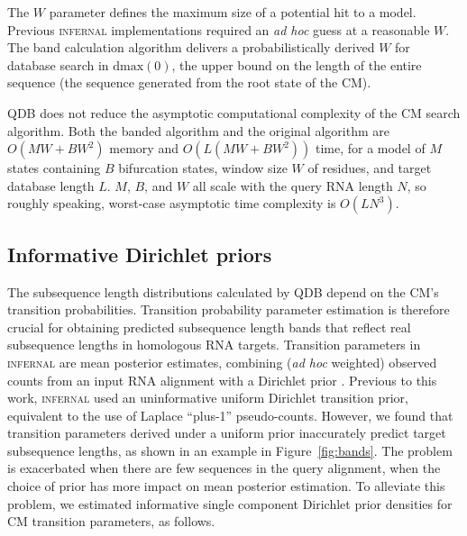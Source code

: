 \documentclass[11pt]{article}
\newif\ifdraft
\begin{document}
The $W$ parameter defines the maximum size of a potential hit to a
model. Previous \textsc{infernal} implementations required an \emph{ad
hoc} guess at a reasonable $W$. The band calculation algorithm
delivers a probabilistically derived $W$ for database search in
$\mbox{dmax}(0)$, the upper bound on the length of the entire
sequence (the sequence generated from the root state of the CM).

QDB does not reduce the asymptotic computational complexity of the CM
search algorithm.  Both the banded algorithm and the original
algorithm are $O(MW + BW^2)$ memory and $O(L(MW + BW^2))$ time, for a
model of $M$ states containing $B$ bifurcation states, window size $W$
of residues, and target database length $L$.  $M$, $B$, and $W$ all
scale with the query RNA length $N$, so roughly speaking,
worst-case asymptotic time complexity is $O(L N^3)$.


\subsection{Informative Dirichlet priors}

The subsequence length distributions calculated by QDB depend on the
CM's transition probabilities. Transition probability parameter
estimation is therefore crucial for obtaining predicted subsequence
length bands that reflect real subsequence lengths in homologous RNA
targets. Transition parameters in \textsc{infernal} are mean posterior
estimates, combining (\emph{ad hoc} weighted) observed counts from an
input RNA alignment with a Dirichlet prior \cite{infguide03}.
Previous to this work, \textsc{infernal} used an uninformative uniform
Dirichlet transition prior, equivalent to the use of Laplace
``plus-1'' pseudo-counts. However, we found that transition parameters
derived under a uniform prior inaccurately predict target subsequence
lengths, as shown in an example in Figure~\ref{fig:bands}.  The
problem is exacerbated when there are few sequences in the query
alignment, when the choice of prior has more impact on mean posterior
estimation.  To alleviate this problem, we estimated informative
single component Dirichlet prior densities for CM transition
parameters, as follows.

\ifdraft

\fi
\end{document}
